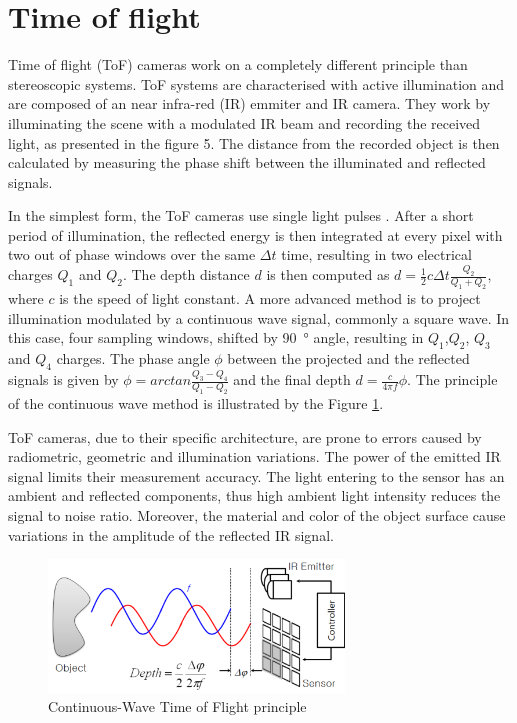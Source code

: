 \section{Time of flight}
\label{sec:tof}

Time of flight (ToF) cameras work on a completely different principle than stereoscopic systems. ToF systems are characterised with active illumination and are composed of an near infra-red (IR) emmiter and IR camera. They work by illuminating the scene with a modulated IR beam and recording the received light, as presented in the figure 5. The distance from the recorded object is then calculated by measuring the phase shift between the illuminated and reflected signals. 

In the simplest form, the ToF cameras use single light pulses \cite{titof}. After a short period of illumination, the reflected energy is then integrated at every pixel with two out of phase windows over the same $\Delta t$ time, resulting in two electrical charges $Q_1$ and $Q_2$. The depth distance $d$ is then computed as $d = \frac{1}{2}c\Delta t \frac{Q_2}{Q_1+Q_2}$, where $c$ is the speed of light constant. A more advanced method is to project illumination modulated by a continuous wave signal, commonly a square wave. In this case, four sampling windows, shifted by \SI{90}{\degree} angle, resulting in $Q_1$,$Q_2$, $Q_3$ and $Q_4$ charges. The phase angle $\phi$ between the projected and the reflected signals is given by $\phi = arctan \frac{Q_3 - Q_4}{Q_1 - Q_2} $ and the final depth $d = \frac{c}{4\pi f}\phi$. The principle of the continuous wave method is illustrated by the Figure \ref{fig:tofprinciple}.

ToF cameras, due to their specific architecture, are prone to errors caused by radiometric, geometric and illumination variations. The power of the emitted IR signal limits their measurement accuracy. The light entering to the sensor has an ambient and reflected components, thus high ambient light intensity reduces the signal to noise ratio. Moreover, the material and color of the object surface cause variations in the amplitude of the reflected IR signal.

\begin{figure}[H]
\label{fig:tof}
\centering
\includegraphics[width=0.7\textwidth]{fig/tofprinciple}
\caption{Continuous-Wave Time of Flight principle \cite{ToFbook}}
\label{fig:tofprinciple}
\end{figure}


